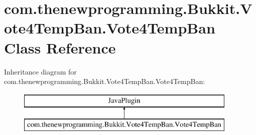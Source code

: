 \hypertarget{classcom_1_1thenewprogramming_1_1_bukkit_1_1_vote4_temp_ban_1_1_vote4_temp_ban}{\section{com.\-thenewprogramming.\-Bukkit.\-Vote4\-Temp\-Ban.\-Vote4\-Temp\-Ban Class Reference}
\label{classcom_1_1thenewprogramming_1_1_bukkit_1_1_vote4_temp_ban_1_1_vote4_temp_ban}
}
Inheritance diagram for com.\-thenewprogramming.\-Bukkit.\-Vote4\-Temp\-Ban.\-Vote4\-Temp\-Ban\-:\begin{figure}[H]
\begin{center}
\leavevmode
\includegraphics[height=2.000000cm]{classcom_1_1thenewprogramming_1_1_bukkit_1_1_vote4_temp_ban_1_1_vote4_temp_ban}
\end{center}
\end{figure}
